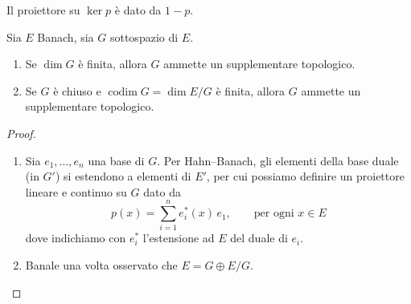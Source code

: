 \begin{remark}
	Il proiettore su $\ker p$ è dato da $1-p$.
\end{remark}

\begin{theorem}
	Sia $E$ Banach, sia $G$ sottospazio di $E$.
	\begin{enumerate}
		\item Se $\dim G$ è finita, allora $G$ ammette un supplementare topologico.
		\item Se $G$ è chiuso e $\operatorname{codim} G = \dim E/G$ è finita, allora $G$ ammette un supplementare topologico.
	\end{enumerate}
\end{theorem}
\begin{proof}
	\leavevmode
	\begin{enumerate}
		\item Sia $e_1, \ldots, e_n$ una base di $G$. Per Hahn--Banach, gli elementi della base duale (in $G'$) si estendono a elementi di $E'$, per cui possiamo definire un proiettore lineare e continuo su $G$ dato da
		\begin{equation*}
			p(x) = \sum_{i=1}^n e^*_i(x)\,e_1, \qquad \text{per ogni $x \in E$}
		\end{equation*}
		dove indichiamo con $e^*_i$ l'estensione ad $E$ del duale di $e_i$.
		\item Banale una volta osservato che $E = G \oplus E/G$.
	\end{enumerate}
\end{proof}
